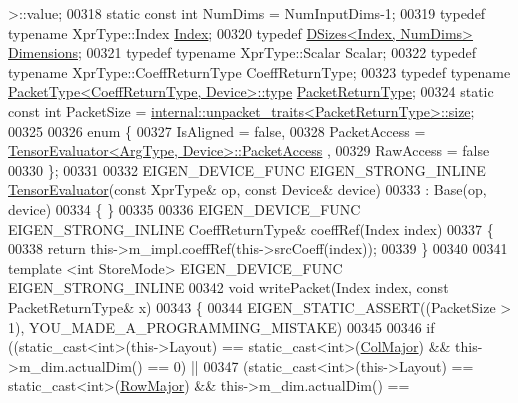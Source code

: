 \begin{DoxyCode}
      >::value;
00318   \textcolor{keyword}{static} \textcolor{keyword}{const} \textcolor{keywordtype}{int} NumDims = NumInputDims-1;
00319   \textcolor{keyword}{typedef} \textcolor{keyword}{typename} XprType::Index \hyperlink{namespace_eigen_a62e77e0933482dafde8fe197d9a2cfde}{Index};
00320   \textcolor{keyword}{typedef} \hyperlink{struct_eigen_1_1_d_sizes}{DSizes<Index, NumDims>} \hyperlink{struct_eigen_1_1_d_sizes}{Dimensions};
00321   \textcolor{keyword}{typedef} \textcolor{keyword}{typename} XprType::Scalar Scalar;
00322   \textcolor{keyword}{typedef} \textcolor{keyword}{typename} XprType::CoeffReturnType CoeffReturnType;
00323   \textcolor{keyword}{typedef} \textcolor{keyword}{typename} \hyperlink{group___sparse_core___module}{PacketType<CoeffReturnType, Device>::type} 
      \hyperlink{group___sparse_core___module}{PacketReturnType};
00324   \textcolor{keyword}{static} \textcolor{keyword}{const} \textcolor{keywordtype}{int} PacketSize = 
      \hyperlink{struct_eigen_1_1internal_1_1unpacket__traits}{internal::unpacket\_traits<PacketReturnType>::size};
00325 
00326   \textcolor{keyword}{enum} \{
00327     IsAligned = \textcolor{keyword}{false},
00328     PacketAccess = \hyperlink{struct_eigen_1_1_tensor_evaluator}{TensorEvaluator<ArgType, Device>::PacketAccess}
      ,
00329     RawAccess = \textcolor{keyword}{false}
00330   \};
00331 
00332   EIGEN\_DEVICE\_FUNC EIGEN\_STRONG\_INLINE \hyperlink{struct_eigen_1_1_tensor_evaluator}{TensorEvaluator}(\textcolor{keyword}{const} XprType& op, \textcolor{keyword}{const} Device& 
      device)
00333     : Base(op, device)
00334     \{ \}
00335 
00336   EIGEN\_DEVICE\_FUNC EIGEN\_STRONG\_INLINE CoeffReturnType& coeffRef(Index index)
00337   \{
00338     \textcolor{keywordflow}{return} this->m\_impl.coeffRef(this->srcCoeff(index));
00339   \}
00340 
00341   \textcolor{keyword}{template} <\textcolor{keywordtype}{int} StoreMode> EIGEN\_DEVICE\_FUNC EIGEN\_STRONG\_INLINE
00342   \textcolor{keywordtype}{void} writePacket(Index index, \textcolor{keyword}{const} PacketReturnType& x)
00343   \{
00344     EIGEN\_STATIC\_ASSERT((PacketSize > 1), YOU\_MADE\_A\_PROGRAMMING\_MISTAKE)
00345 
00346     \textcolor{keywordflow}{if} ((static\_cast<int>(this->Layout) == static\_cast<int>(\hyperlink{group__enums_ggaacded1a18ae58b0f554751f6cdf9eb13a0cbd4bdd0abcfc0224c5fcb5e4f6669a}{ColMajor}) && this->m\_dim.actualDim() ==
       0) ||
00347     (static\_cast<int>(this->Layout) == \textcolor{keyword}{static\_cast<}\textcolor{keywordtype}{int}\textcolor{keyword}{>}(\hyperlink{group__enums_ggaacded1a18ae58b0f554751f6cdf9eb13acfcde9cd8677c5f7caf6bd603666aae3}{RowMajor}) && this->m\_dim.actualDim() == 

\end{DoxyCode}
